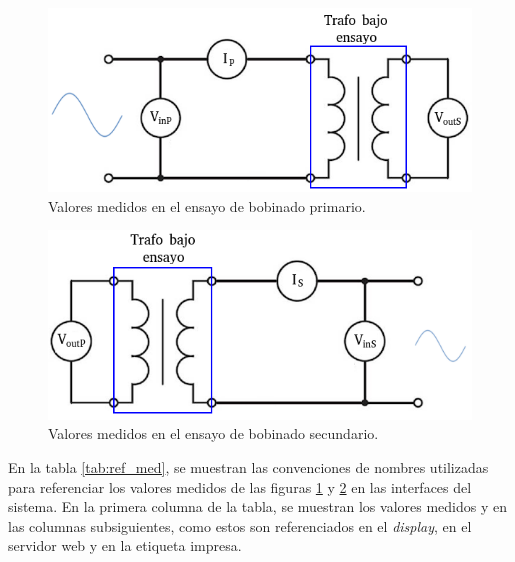 \begin{figure}[htpb]
	\centering
	\includegraphics[scale=0.7]{./Figures/EnsayoPrimario.png}
	\caption{Valores medidos en el ensayo de bobinado primario.}
	\label{fig:EnsayoPrimario}
\end{figure}

\begin{figure}[htpb]
	\centering
	\includegraphics[scale=0.7]{./Figures/EnsayoSecu.png}
	\caption{Valores medidos en el ensayo de bobinado secundario.}
	\label{fig:EnsayoSecu}
\end{figure}

En la tabla \ref{tab:ref_med}, se muestran las convenciones de nombres utilizadas para referenciar los valores medidos de las figuras \ref{fig:EnsayoPrimario} y \ref{fig:EnsayoSecu} en las interfaces del sistema. En la primera columna de la tabla, se muestran los valores medidos y en las columnas subsiguientes, como estos son referenciados en el \textit{display}, en el servidor web y en la etiqueta impresa. 

